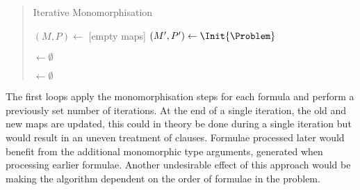 \documentclass[]{ceurart}
\begin{document}
\begin{quote}
\begin{algorithm}




   \caption{Iterative Monomorphisation}

   \((M, P) \leftarrow\) [empty maps]\;
   \((M', P') \leftarrow \Init{\Problem}\)\;

   \AllSubst\(\leftarrow \emptyset\)\;



   \NewFormulae \(\leftarrow\emptyset\)\;

\end{algorithm}
\end{quote}

The first loops apply the monomorphisation steps for each formula and perform a previously set number of iterations. At the end of a single iteration, the old and new maps are updated, this could in theory be done during a single iteration but would result in an uneven treatment of clauses. Formulae processed later would benefit from the additional monomorphic type arguments, generated when processing earlier formulae. Another undesirable effect of this approach would be making the algorithm dependent on the order of formulae in the problem.
\end{document}
